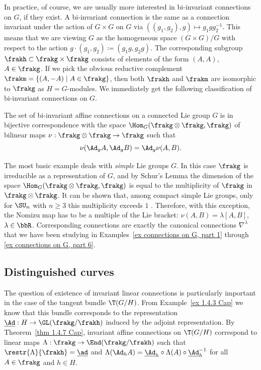 In practice, of course, we are usually more interested in bi-invariant connections on $G$, if they exist. A bi-invariant connection is the same as a connection invariant under the action of $G\times G$ on $G$ via $((g_1,g_2),g)\mapsto g_1gg_2^{-1}$. This means that we are viewing $G$ as the homogeneous space $(G\times G)\slash G$ with respect to the action $g\cdot (g_1,g_2)\coloneqq (g_1g,g_2g)$. The corresponding subgroup $\frakh\subset\frakg\times\frakg$ consists of elements of the form $(A,A)$, $A\in\frakg$. If we pick the obvious reductive complement $\frakm=\{(A,-A)\mid A\in\frakg\}$, then both $\frakh$ and $\frakm$ are isomorphic to $\frakg$ as $H=G$-modules. We immediately get the following classification of bi-invariant connections on $G$.

\begin{cor}
    The set of bi-invariant affine connections on a connected Lie group $G$ is in bijective correspondence with the space $\Hom_G(\frakg\otimes\frakg,\frakg)$ of bilinear maps $\nu:\frakg\otimes\frakg\to \frakg$ such that 
    \[\nu(\Ad_g A,\Ad_g B)=\Ad_g \nu(A,B).\]
\end{cor}

The most basic example deals with \emph{simple} Lie groups $G$. In this case $\frakg$ is irreducible as a representation of $G$, and by Schur's Lemma the dimension of the space $\Hom_G(\frakg\otimes\frakg,\frakg)$ is equal to the multiplicity of $\frakg$ in $\frakg\otimes\frakg$. It can be shown that, among compact simple Lie groups, only for $\SU_n$ with $n\geq 3$ this multiplicity exceeds $1$ \cite{Laquer}. Therefore, with this exception, the Nomizu map has to be a multiple of the Lie bracket: $\nu(A,B)=\lambda[A,B]$, $\lambda\in\bbR$. Corresponding connections are exactly the canonical connections $\nabla^\lambda$ that we have been studying in Examples~\ref{ex connections on G, part 1} through \ref{ex connections on G, part 6}.







\subsection{Distinguished curves}


The question of existence of invariant linear connections is particularly important in the case of the tangent bundle $\T(G\slash H)$. From Example~\ref{ex 1.4.3 Cap} we know that this bundle corresponds to the representation $\underline{\Ad}:H\to \GL(\frakg\slash\frakh)$ induced by the adjoint representation. By Theorem~\ref{thm 1.4.7 Cap}, invariant affine connections on $\T(G\slash H)$ correspond to linear maps $\Lambda:\frakg\to \End(\frakg\slash\frakh)$ such that $\restr{\Lambda}{\frakh}=\underline{\ad}$ and $\Lambda(\Ad_h A)=\underline{\Ad}_h\circ\Lambda(A)\circ \underline{\Ad}_h^{-1}$ for all $A\in\frakg$ and $h\in H$.

